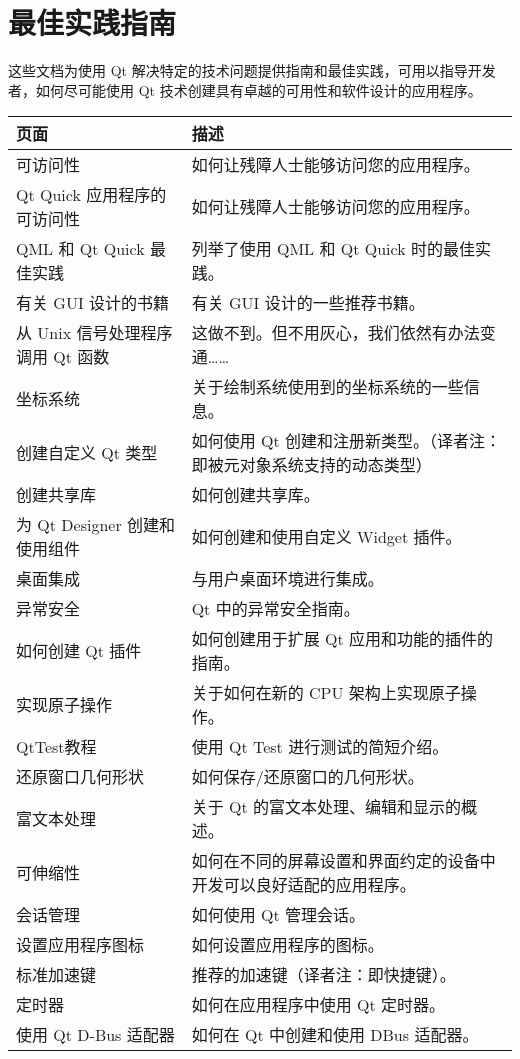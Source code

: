 \chapter{最佳实践指南}

这些文档为使用 Qt 解决特定的技术问题提供指南和最佳实践，可用以指导开发者，如何尽可能使用 Qt 技术创建具有卓越的可用性和软件设计的应用程序。

\begin{longtable}[l]{|l|m{25em}|}
\hline
页面	& 描述 \\ 
\hline
可访问性	& 如何让残障人士能够访问您的应用程序。 \\ 
\hline
Qt Quick 应用程序的可访问性 &	如何让残障人士能够访问您的应用程序。 \\ 
\hline
QML 和 Qt Quick 最佳实践	& 列举了使用 QML 和 Qt Quick 时的最佳实践。 \\ 
\hline
有关 GUI 设计的书籍	& 有关 GUI 设计的一些推荐书籍。 \\ 
\hline
从 Unix 信号处理程序调用 Qt 函数 & 	这做不到。但不用灰心，我们依然有办法变通…… \\ 
\hline
坐标系统	& 关于绘制系统使用到的坐标系统的一些信息。 \\ 
\hline
创建自定义 Qt 类型	& 如何使用 Qt 创建和注册新类型。（译者注：即被元对象系统支持的动态类型） \\ 
\hline
创建共享库	& 如何创建共享库。 \\ 
\hline
为 Qt Designer 创建和使用组件 & 	如何创建和使用自定义 Widget 插件。\\
\hline
桌面集成 &	与用户桌面环境进行集成。\\ 
\hline
异常安全 &	Qt 中的异常安全指南。\\ 
\hline
如何创建 Qt 插件 &	如何创建用于扩展 Qt 应用和功能的插件的指南。\\ 
\hline
实现原子操作	& 关于如何在新的 CPU 架构上实现原子操作。 \\ 
\hline
QtTest教程	& 使用 Qt Test 进行测试的简短介绍。 \\ 
\hline
还原窗口几何形状 &	如何保存/还原窗口的几何形状。\\ 
\hline
富文本处理 &	关于 Qt 的富文本处理、编辑和显示的概述。\\ 
\hline
可伸缩性	& 如何在不同的屏幕设置和界面约定的设备中开发可以良好适配的应用程序。\\ 
\hline
会话管理	& 如何使用 Qt 管理会话。 \\ 
\hline
设置应用程序图标	& 如何设置应用程序的图标。\\ 
\hline
标准加速键	& 推荐的加速键（译者注：即快捷键）。\\ 
\hline
定时器 & 	如何在应用程序中使用 Qt 定时器。\\ 
\hline
使用 Qt D-Bus 适配器 &	如何在 Qt 中创建和使用 DBus 适配器。\\ 
	\hline
\end{longtable}